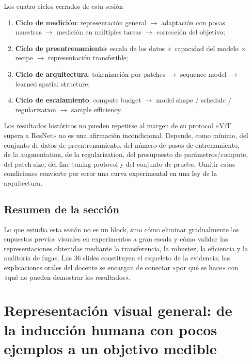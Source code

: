 \documentclass[a4paper]{article}
\begin{document}
\begin{importantbox}{Los cuatro ciclos cerrados de esta sesión}
\begin{enumerate}
  \item \textbf{Ciclo de medición}: representación general $\rightarrow$ adaptación con pocas muestras $\rightarrow$ medición en múltiples tareas $\rightarrow$ corrección del objetivo;
  \item \textbf{Ciclo de preentrenamiento}: escala de los datos $\times$ capacidad del modelo $\times$ recipe $\rightarrow$ representación transferible;
  \item \textbf{Ciclo de arquitectura}: tokenización por patches $\rightarrow$ sequence model $\rightarrow$ learned spatial structure;
  \item \textbf{Ciclo de escalamiento}: compute budget $\rightarrow$ model shape / schedule / regularization $\rightarrow$ sample efficiency.
\end{enumerate}
\end{importantbox}

\begin{warningbox}{Los resultados históricos no pueden repetirse al margen de su protocol}
«ViT supera a ResNet» no es una afirmación incondicional. Depende, como mínimo, del conjunto de datos de preentrenamiento, del número de pasos de entrenamiento, de la augmentation, de la regularization, del presupuesto de parámetros/compute, del patch size, del fine-tuning protocol y del conjunto de prueba. Omitir estas condiciones convierte por error una curva experimental en una ley de la arquitectura.
\end{warningbox}

\subsection{Resumen de la sección}

Lo que estudia esta sesión no es un block, sino cómo eliminar gradualmente los supuestos previos visuales en experimentos a gran escala y cómo validar las representaciones obtenidas mediante la transferencia, la robustez, la eficiencia y la auditoría de fugas. Las 36 slides constituyen el esqueleto de la evidencia; las explicaciones orales del docente se encargan de conectar «por qué se hace» con «qué no pueden demostrar los resultados».
\section{Representación visual general: de la inducción humana con pocos ejemplos a un objetivo medible}
\end{document}
